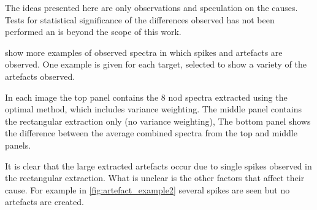 The ideas presented here are only observations and speculation on the causes.
Tests for statistical significance of the differences observed has not been performed an is beyond the scope of this work.

 show more examples of observed spectra in which spikes and artefacts are observed.
One example is given for each target, selected to show a variety of the artefacts observed.

In each image the top panel contains the 8 nod spectra extracted using the optimal method, which includes variance weighting.
The middle panel contains the rectangular extraction only (no variance weighting), The bottom panel shows the difference between the average combined spectra from the top and middle panels.

It is clear that the large extracted artefacts occur due to single spikes observed in the rectangular extraction.
What is unclear is the other factors that affect their cause.
For example in \cref{fig:artefact_example2} several spikes are seen but no artefacts are created.

